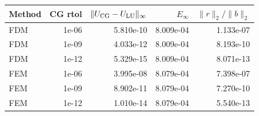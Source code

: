 \begin{tabular}{lrrrr}
\toprule
Method & CG rtol & $\|U_{\rm CG}-U_{\rm LU}\|_\infty$ & $E_\infty$ & $\|r\|_2/\|b\|_2$\\
\midrule
FDM & 1e-06 & 5.810e-10 & 8.009e-04 & 1.133e-07\\
FDM & 1e-09 & 4.033e-12 & 8.009e-04 & 8.193e-10\\
FDM & 1e-12 & 5.329e-15 & 8.009e-04 & 8.071e-13\\
FEM & 1e-06 & 3.995e-08 & 8.079e-04 & 7.398e-07\\
FEM & 1e-09 & 8.902e-11 & 8.079e-04 & 7.270e-10\\
FEM & 1e-12 & 1.010e-14 & 8.079e-04 & 5.540e-13\\
\bottomrule
\end{tabular}
